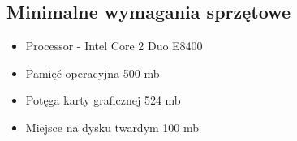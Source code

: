 \subsection{Minimalne wymagania sprzętowe}
\begin{itemize}
    \item Processor - Intel Core 2 Duo E8400
    \item Pamięć operacyjna 500 mb
    \item Potęga karty graficznej 524 mb
    \item Miejsce na dysku twardym 100 mb
\end{itemize}
